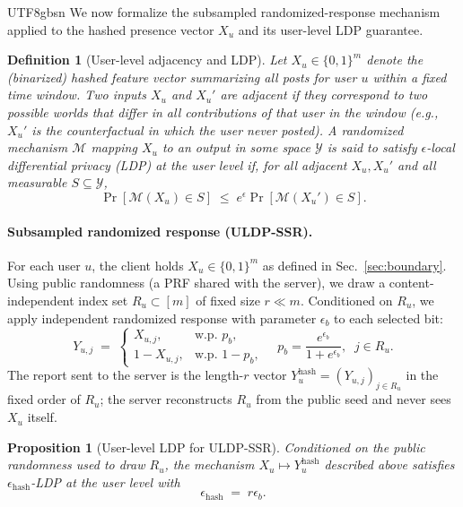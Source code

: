 \documentclass[lettersize,journal]{IEEEtran}
\newtheorem{definition}{Definition}
\newtheorem{proposition}{Proposition}
\begin{document}
\begin{CJK*}{UTF8}{gbsn}
We now formalize the subsampled randomized-response mechanism applied to the hashed presence vector $X_u$ and its user-level LDP guarantee.

\begin{definition}[User-level adjacency and LDP]
\label{def:uldp}
Let $X_u \in \{0,1\}^m$ denote the (binarized) hashed feature vector summarizing all posts for user $u$ within a fixed time window. Two inputs $X_u$ and $X_u'$ are adjacent if they correspond to two possible worlds that differ in all contributions of that user in the window (e.g., $X_u'$ is the counterfactual in which the user never posted). A randomized mechanism $\mathcal{M}$ mapping $X_u$ to an output in some space $\mathcal{Y}$ is said to satisfy $\epsilon$-local differential privacy (LDP) at the user level if, for all adjacent $X_u,X_u'$ and all measurable $S \subseteq \mathcal{Y}$,
\begin{equation}
  \Pr[\mathcal{M}(X_u) \in S]
  \;\le\; e^\epsilon \Pr[\mathcal{M}(X_u') \in S].
\end{equation}
\end{definition}

\paragraph{Subsampled randomized response (ULDP-SSR).}
For each user $u$, the client holds $X_u \in \{0,1\}^m$ as defined in Sec.~\ref{sec:boundary}. Using public randomness (a PRF shared with the server), we draw a content-independent index set $R_u \subset [m]$ of fixed size $r \ll m$. Conditioned on $R_u$, we apply independent randomized response with parameter $\epsilon_b$ to each selected bit:
\begin{equation}
  Y_{u,j} \;=\;
  \begin{cases}
    X_{u,j},      & \text{w.p. } p_b,\\[0.8ex]
    1 - X_{u,j},  & \text{w.p. } 1-p_b,
  \end{cases}
  \quad
  p_b = \frac{e^{\epsilon_b}}{1+e^{\epsilon_b}},\;\; j \in R_u.
\end{equation}
The report sent to the server is the length-$r$ vector
$Y^{\text{hash}}_u = (Y_{u,j})_{j \in R_u}$ in the fixed order of $R_u$; the server reconstructs $R_u$ from the public seed and never sees $X_u$ itself.

\begin{proposition}[User-level LDP for ULDP-SSR]
\label{prop:uldp-ssr}
Conditioned on the public randomness used to draw $R_u$, the mechanism $X_u \mapsto Y^{\text{hash}}_u$ described above satisfies $\epsilon_{\text{hash}}$-LDP at the user level with
\begin{equation}
  \epsilon_{\text{hash}} \;=\; r \epsilon_b.
\end{equation}
\end{proposition}


\end{CJK*}
\end{document}
